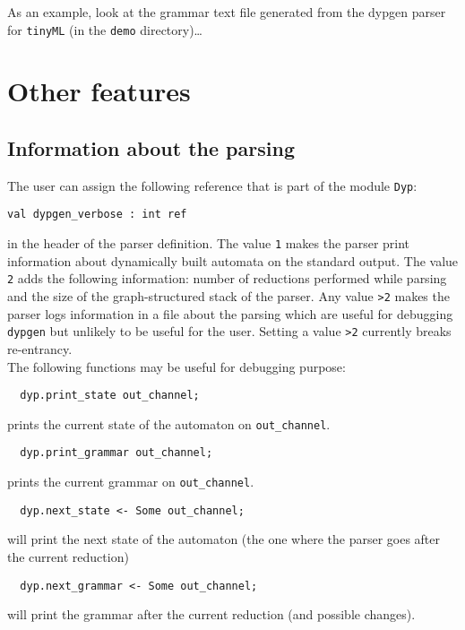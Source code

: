 \documentclass[12pt]{article}
\begin{document}
{As an example, look at the grammar text file generated from the dypgen
parser for \verb|tinyML| (in the \verb|demo| directory)\ldots

\section{Other features}

\subsection{Information about the parsing}\label{verbose}

The user can assign the following reference that is part of the module \verb|Dyp|:
\begin{verbatim}
val dypgen_verbose : int ref
\end{verbatim}
in the header of the parser definition. The value \texttt{1} makes the parser print information about dynamically built automata on the standard output. The value \texttt{2} adds the following information: number of reductions performed while parsing and the size of the graph-structured stack of the parser. Any value \texttt{>2} makes the parser logs information in a file about the parsing which are useful for debugging \texttt{dypgen} but unlikely to be useful for the user. Setting a value \verb|>2| currently breaks re-entrancy.\\

The following functions may be useful for debugging purpose:
\begin{verbatim}
  dyp.print_state out_channel;
\end{verbatim}
prints the current state of the automaton on \verb|out_channel|.

\begin{verbatim}
  dyp.print_grammar out_channel;
\end{verbatim}
prints the current grammar on \verb|out_channel|.

\begin{verbatim}
  dyp.next_state <- Some out_channel;
\end{verbatim}
will print the next state of the automaton (the one where the parser
goes after the current reduction)

\begin{verbatim}
  dyp.next_grammar <- Some out_channel;
\end{verbatim}
will print the grammar after the current reduction (and possible changes).\\

}
\end{document}
